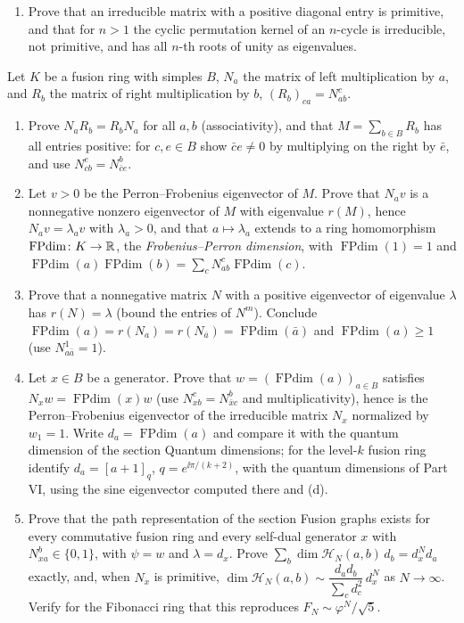 \begin{exercise}
\begin{enumerate}[label=(\alph*)]
\item Prove that an irreducible matrix with a positive diagonal entry is primitive, and that for $n>1$ the cyclic permutation kernel of an $n$-cycle is irreducible, not primitive, and has all $n$-th roots of unity as eigenvalues.
\end{enumerate}
\end{exercise}

\begin{exercise}
Let $K$ be a fusion ring with simples $B$, $N_a$ the matrix of left multiplication by $a$, and $R_b$ the matrix of right multiplication by $b$, $(R_b)_{ca}=N_{ab}^c$.
\begin{enumerate}[label=(\alph*)]
\item Prove $N_aR_b=R_bN_a$ for all $a,b$ (associativity), and that $M=\sum_{b\in B}R_b$ has all entries positive: for $c,e\in B$ show $\bar ce\ne0$ by multiplying on the right by $\bar e$, and use $N_{cb}^e=N_{\bar ce}^b$.
\item Let $v>0$ be the Perron--Frobenius eigenvector of $M$. Prove that $N_av$ is a nonnegative nonzero eigenvector of $M$ with eigenvalue $r(M)$, hence $N_av=\lambda_av$ with $\lambda_a>0$, and that $a\mapsto\lambda_a$ extends to a ring homomorphism $\operatorname{FPdim}\colon K\to\mathbb R$, the \emph{Frobenius--Perron dimension}, with $\operatorname{FPdim}(1)=1$ and $\operatorname{FPdim}(a)\operatorname{FPdim}(b)=\sum_cN_{ab}^c\operatorname{FPdim}(c)$.
\item Prove that a nonnegative matrix $N$ with a positive eigenvector of eigenvalue $\lambda$ has $r(N)=\lambda$ (bound the entries of $N^m$). Conclude $\operatorname{FPdim}(a)=r(N_a)=r(N_{\bar a})=\operatorname{FPdim}(\bar a)$ and $\operatorname{FPdim}(a)\ge1$ (use $N_{a\bar a}^1=1$).
\item Let $x\in B$ be a generator. Prove that $w=(\operatorname{FPdim}(a))_{a\in B}$ satisfies $N_xw=\operatorname{FPdim}(x)w$ (use $N_{xb}^c=N_{\bar xc}^b$ and multiplicativity), hence is the Perron--Frobenius eigenvector of the irreducible matrix $N_x$ normalized by $w_1=1$. Write $d_a=\operatorname{FPdim}(a)$ and compare it with the quantum dimension of the section Quantum dimensions; for the level-$k$ fusion ring identify $d_a=[a+1]_q$, $q=e^{\ii\pi/(k+2)}$, with the quantum dimensions of Part VI, using the sine eigenvector computed there and (d).
\item Prove that the path representation of the section Fusion graphs exists for every commutative fusion ring and every self-dual generator $x$ with $N_{xa}^b\in\{0,1\}$, with $\psi=w$ and $\lambda=d_x$. Prove $\sum_b\dim\mathcal H_N(a,b)\,d_b=d_x^Nd_a$ exactly, and, when $N_x$ is primitive, $\dim\mathcal H_N(a,b)\sim\dfrac{d_ad_b}{\sum_cd_c^2}\,d_x^{N}$ as $N\to\infty$. Verify for the Fibonacci ring that this reproduces $F_N\sim\varphi^N/\sqrt5$.
\end{enumerate}
\end{exercise}


